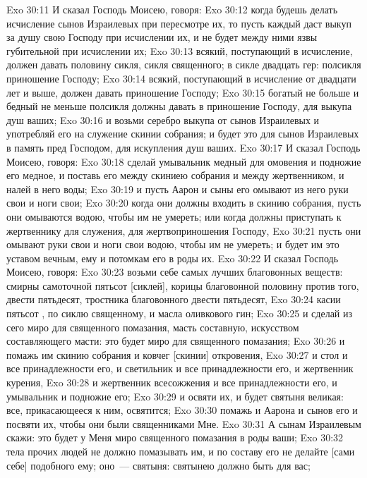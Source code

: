 \rsbpar\vs Exo 30:11 И сказал Господь Моисею, говоря:
\vs Exo 30:12 когда будешь делать исчисление сынов Израилевых при пересмотре их, то пусть каждый даст выкуп за душу свою Господу при исчислении их, и не будет между ними язвы губительной при исчислении их;
\vs Exo 30:13 всякий, поступающий в исчисление, должен давать половину сикля, сикля священного; в сикле двадцать гер: полсикля приношение Господу;
\vs Exo 30:14 всякий, поступающий в исчисление от двадцати лет и выше, должен давать приношение Господу;
\vs Exo 30:15 богатый не больше и бедный не меньше полсикля должны давать в приношение Господу, для выкупа душ ваших;
\vs Exo 30:16 и возьми серебро выкупа от сынов Израилевых и употребляй его на служение скинии собрания; и будет это для сынов Израилевых в память пред Господом, для искупления душ ваших.
\rsbpar\vs Exo 30:17 И сказал Господь Моисею, говоря:
\vs Exo 30:18 сделай умывальник медный для омовения и подножие его медное, и поставь его между скиниею собрания и между жертвенником, и налей в него воды;
\vs Exo 30:19 и пусть Аарон и сыны его омывают из него руки свои и ноги свои;
\vs Exo 30:20 когда они должны входить в скинию собрания, пусть они омываются водою, чтобы им не умереть; или когда должны приступать к жертвеннику для служения, для жертвоприношения Господу,
\vs Exo 30:21 пусть они омывают руки свои и ноги свои водою, чтобы им не умереть; и будет им это уставом вечным, ему и потомкам его в роды их.
\rsbpar\vs Exo 30:22 И сказал Господь Моисею, говоря:
\vs Exo 30:23 возьми себе самых лучших благовонных веществ: смирны самоточной пятьсот [сиклей], корицы благовонной половину против того, двести пятьдесят, тростника благовонного двести пятьдесят,
\vs Exo 30:24 касии пятьсот , по сиклю священному, и масла оливкового гин;
\vs Exo 30:25 и сделай из сего миро для священного помазания, масть составную, искусством составляющего масти: это будет миро для священного помазания;
\vs Exo 30:26 и помажь им скинию собрания и ковчег [скинии] откровения,
\vs Exo 30:27 и стол и все принадлежности его, и светильник и все принадлежности его, и жертвенник курения,
\vs Exo 30:28 и жертвенник всесожжения и все принадлежности его, и умывальник и подножие его;
\vs Exo 30:29 и освяти их, и будет святыня великая: все, прикасающееся к ним, освятится;
\vs Exo 30:30 помажь и Аарона и сынов его и посвяти их, чтобы они были священниками Мне.
\vs Exo 30:31 А сынам Израилевым скажи: это будет у Меня миро священного помазания в роды ваши;
\vs Exo 30:32 тела прочих людей не должно помазывать им, и по составу его не делайте [сами себе] подобного ему; оно~--- святыня: святынею должно быть для вас;
